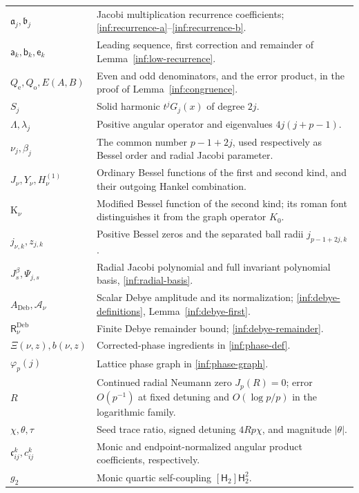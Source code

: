 \begin{longtable}{@{}>{\raggedright\arraybackslash}p{}>{\raggedright\arraybackslash}p{}@{}}
$\mathfrak a_j,\mathfrak b_j$ & Jacobi multiplication recurrence coefficients; \eqref{inf:recurrence-a}--\eqref{inf:recurrence-b}.\\
$\mathsf a_k,\mathsf b_k,\mathsf e_k$ & Leading sequence, first correction and remainder of Lemma~\ref{inf:low-recurrence}.\\
$Q_{\mathrm e},Q_{\mathrm o},E(A,B)$ & Even and odd denominators, and the error product, in the proof of Lemma~\ref{inf:congruence}.\\
$S_j$ & Solid harmonic $t^jG_j(x)$ of degree $2j$.\\
$\Lambda,\lambda_j$ & Positive angular operator and eigenvalues $4j(j+p-1)$.\\
$\nu_j,\beta_j$ & The common number $p-1+2j$, used respectively as Bessel order and radial Jacobi parameter.\\
$J_\nu,Y_\nu,H^{(1)}_\nu$ & Ordinary Bessel functions of the first and second kind, and their outgoing Hankel combination.\\
$\mathrm K_\nu$ & Modified Bessel function of the second kind; its roman font distinguishes it from the graph operator $K_0$.\\
$j_{\nu,k},z_{j,k}$ & Positive Bessel zeros and the separated ball radii $j_{p-1+2j,k}$.\\
$J_s^\beta,\Psi_{j,s}$ & Radial Jacobi polynomial and full invariant polynomial basis, \eqref{inf:radial-basis}.\\
$A_{\mathrm{Deb}},\mathcal A_\nu$ & Scalar Debye amplitude and its normalization; \eqref{inf:debye-definitions}, Lemma~\ref{inf:debye-first}.\\
$\mathsf R_\nu^{\mathrm{Deb}}$ & Finite Debye remainder bound; \eqref{inf:debye-remainder}.\\
$\Xi(\nu,z),b(\nu,z)$ & Corrected-phase ingredients in \eqref{inf:phase-def}.\\
$\varphi_p(j)$ & Lattice phase graph in \eqref{inf:phase-graph}.\\
$R$ & Continued radial Neumann zero $J_p(R)=0$; error $O(p^{-1})$ at fixed detuning and $O(\log p/p)$ in the logarithmic family.\\
$\chi,\theta,\tau$ & Seed trace ratio, signed detuning $4Rp\chi$, and magnitude $|\theta|$.\\
$\mathfrak c_{ij}^k,c_{ij}^k$ & Monic and endpoint-normalized angular product coefficients, respectively.\\
$g_2$ & Monic quartic self-coupling $[\mathsf H_2]\mathsf H_2^2$.\\

\end{longtable}
